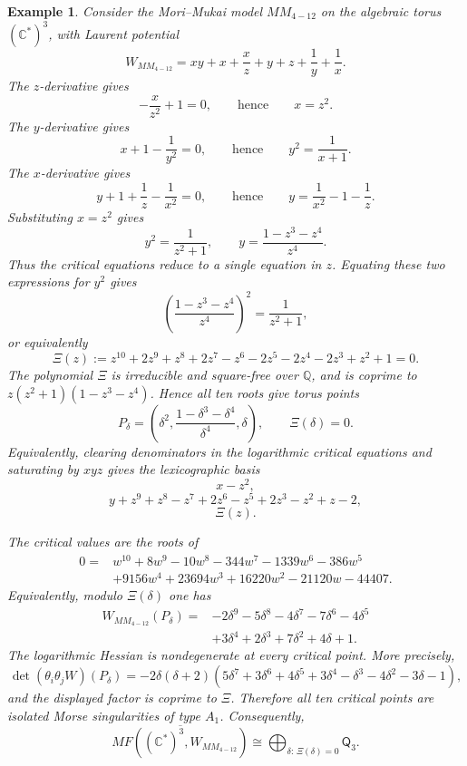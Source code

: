 \documentclass[11pt]{amsart}
\newtheorem{example}{Example}[section]
\newcommand{\MorseCat}[1]{\mathsf{Q}_{#1}}
\begin{document}
\begin{example}
Consider the Mori--Mukai model $MM_{4-12}$ on the algebraic torus
$(\mathbb{C}^*)^3$, with Laurent potential
\[
W_{MM_{4-12}}=xy+x+\frac{x}{z}+y+z+\frac{1}{y}+\frac{1}{x}.
\]
The $z$-derivative gives
\[
-\frac{x}{z^2}+1=0,
\qquad\text{hence}\qquad
x=z^2.
\]
The $y$-derivative gives
\[
x+1-\frac{1}{y^2}=0,
\qquad\text{hence}\qquad
y^2=\frac{1}{x+1}.
\]
The $x$-derivative gives
\[
y+1+\frac{1}{z}-\frac{1}{x^2}=0,
\qquad\text{hence}\qquad
y=\frac{1}{x^2}-1-\frac{1}{z}.
\]
Substituting $x=z^2$ gives
\[
y^2=\frac{1}{z^2+1},
\qquad
y=\frac{1-z^3-z^4}{z^4}.
\]
Thus the critical equations reduce to a single equation in $z$. Equating these
two expressions for $y^2$ gives
\[
\left(\frac{1-z^3-z^4}{z^4}\right)^2=\frac{1}{z^2+1},
\]
or equivalently
\[
\Xi(z):=z^{10}+2z^9+z^8+2z^7-z^6-2z^5
-2z^4-2z^3+z^2+1=0.
\]
The polynomial $\Xi$ is irreducible and square-free over $\mathbb{Q}$, and is
coprime to $z(z^2+1)(1-z^3-z^4)$. Hence all ten roots give torus points
\[
P_\delta=\left(
\delta^2,
\frac{1-\delta^3-\delta^4}{\delta^4},
\delta
\right),
\qquad
\Xi(\delta)=0.
\]
Equivalently, clearing denominators in the logarithmic critical equations and
saturating by $xyz$ gives the lexicographic basis
\[
x-z^2,
\]
\[
y+z^9+z^8-z^7+2z^6-z^5+2z^3-z^2+z-2,
\]
\[
\Xi(z).
\]

The critical values are the roots of
\[
\begin{aligned}
0={}&w^{10}+8w^9-10w^8-344w^7-1339w^6-386w^5 \\
&+9156w^4+23694w^3+16220w^2-21120w-44407.
\end{aligned}
\]
Equivalently, modulo $\Xi(\delta)$ one has
\[
\begin{aligned}
W_{MM_{4-12}}(P_\delta)={}&
-2\delta^9-5\delta^8-4\delta^7-7\delta^6-4\delta^5 \\
&+3\delta^4+2\delta^3+7\delta^2+4\delta+1.
\end{aligned}
\]
The logarithmic Hessian is nondegenerate at every critical point. More
precisely,
\[
\det(\theta_i\theta_jW)(P_\delta)
=-2\delta(\delta+2)(5\delta^7+3\delta^6+4\delta^5+3\delta^4
-\delta^3-4\delta^2-3\delta-1),
\]
and the displayed factor is coprime to $\Xi$. Therefore all ten critical
points are isolated Morse singularities of type $A_1$. Consequently,
\[
\overline{MF((\mathbb{C}^*)^3,W_{MM_{4-12}})}
\cong \bigoplus_{\delta:\,\Xi(\delta)=0}\MorseCat{3}.
\]
\end{example}
\end{document}
